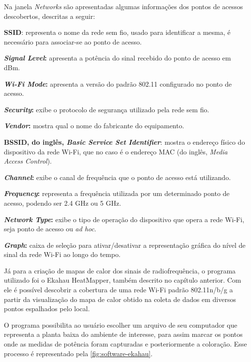 Na janela \textit{Networks} são apresentadas algumas informações dos pontos de acessos descobertos, descritas a seguir:

\begin{compactitem}
	\item \textbf{SSID}: representa o nome da rede sem fio, usado para identificar a mesma, é necessário para associar-se ao ponto de acesso.
	\item \textbf{\textit{Signal Level}:} apresenta a potência do sinal recebido do ponto de acesso em dBm.
	\item \textbf{\textit{Wi-Fi Mode}:} apresenta a versão do padrão 802.11 configurado no ponto de acesso.
	\item \textbf{\textit{Security}:} exibe o protocolo de segurança utilizado pela rede sem fio.
	\item \textbf{\textit{Vendor}:} mostra qual o nome do fabricante do equipamento.
	\item \textbf{BSSID, do inglês, \textit{Basic Service Set Identifier}}: mostra o endereço físico do dispositivo da rede Wi-Fi, que no caso é o endereço MAC (do inglês, \textit{Media Access Control}).
	\item \textbf{\textit{Channel}:} exibe o canal de frequência que o ponto de acesso está utilizando.
	\item \textbf{\textit{Frequency}:} representa a frequência utilizada por um determinado ponto de acesso, podendo ser 2.4 GHz ou 5 GHz.
	\item \textbf{\textit{Network Type}:} exibe o tipo de operação do dispositivo que opera a rede Wi-Fi, seja ponto de acesso ou \textit{ad hoc}.
	\item \textbf{\textit{Graph}:} caixa de seleção para ativar/desativar a representação gráfica do nível de sinal da rede Wi-Fi ao longo do tempo.
\end{compactitem}
	
Já para a criação de mapas de calor dos sinais de radiofrequência, o programa utilizado foi o Ekahau HeatMapper, também descrito no capítulo anterior. Com ele é possível descobrir a cobertura de uma rede Wi-Fi padrão 802.11n/b/g a partir da visualização do mapa de calor obtido na coleta de dados em diversos pontos espalhados pelo local.

O programa possibilita ao usuário escolher um arquivo de seu computador que representa a planta baixa do ambiente de interesse, para assim marcar os pontos onde as medidas de potência foram capturadas e posteriormente a coloração. Esse processo é representado pela \autoref{fig:software-ekahau}.


